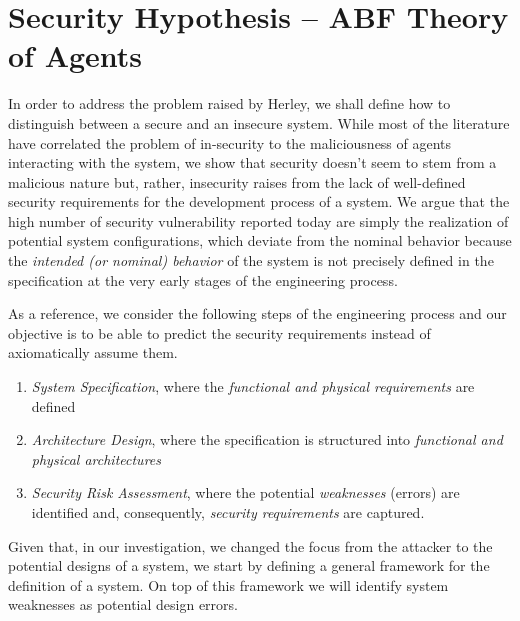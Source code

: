 \documentclass[conference]{IEEEtran}
\begin{document}
\section{Security Hypothesis -- ABF Theory of Agents}\label{sec:hypothesis}
In order to address the problem raised by Herley, we shall define how to
distinguish between a secure and an insecure system. While most of the
literature have correlated the problem of in-security
to the maliciousness of agents interacting with the system, we show that
security doesn't seem to stem from a malicious nature but, rather, insecurity
raises from the lack of well-defined security requirements for the development
process of a system. We argue that the high number of security vulnerability
reported today are simply the realization of potential system configurations,
which deviate from the nominal behavior because the \emph{intended (or
nominal) behavior} of the system is not precisely defined in the specification
at the very early stages of the engineering process.

As a reference, we consider the following steps of the engineering process
and our objective is to be able to predict the security requirements
instead of axiomatically assume them.
\begin{enumerate}
	\item \emph{System Specification}, where the \emph{functional and physical requirements} are defined
	\item \emph{Architecture Design}, where the specification is structured into \emph{functional and physical architectures}
	\item \emph{Security Risk Assessment}, where the potential \emph{weaknesses} (errors)
		are identified and, consequently, \emph{security requirements} are
		captured.
\end{enumerate}
Given that, in our investigation, we changed the focus from the attacker to the
potential designs of a system, we start by defining a general framework for the definition
of a system. On top of this framework we will identify system weaknesses as potential
design errors.
\end{document}
